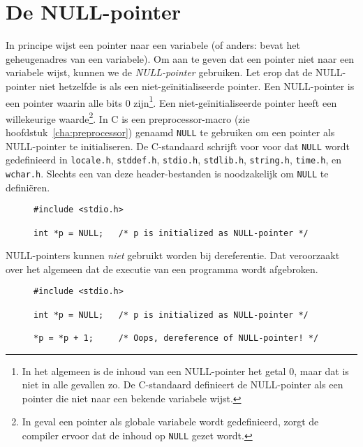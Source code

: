 \section{De NULL-pointer}
\label{sec:nullpointer}
In principe wijst een pointer naar een variabele (of anders: bevat het geheugenadres van een variabele). Om aan te geven dat een pointer niet naar een variabele wijst, kunnen we de \textsl{NULL-pointer} gebruiken. Let erop dat de NULL-pointer niet hetzelfde is als een niet-geïnitialiseerde pointer. Een NULL-pointer is een pointer waarin alle bits 0 zijn\footnote{In het algemeen is de inhoud van een NULL-pointer het getal 0, maar dat is niet in alle gevallen zo. De C-standaard definieert de NULL-pointer als een pointer die niet naar een bekende variabele wijst.}. Een niet-geïnitialiseerde pointer heeft een willekeurige waarde\footnote{In geval een pointer als globale variabele wordt gedefinieerd, zorgt de compiler ervoor dat de inhoud op \texttt{NULL} gezet wordt.}. In C is een preprocessor-macro (zie hoofdstuk~\ref{cha:preprocessor}) genaamd \texttt{NULL} te gebruiken om een pointer als NULL-pointer te initialiseren. De C-standaard schrijft voor voor dat \texttt{NULL} wordt gedefinieerd in \texttt{locale.h}, \texttt{stddef.h}, \texttt{stdio.h}, \texttt{stdlib.h}, \texttt{string.h}, \texttt{time.h}, en \texttt{wchar.h}. Slechts een van deze header-bestanden is noodzakelijk om \texttt{NULL} te definiëren.

\begin{figure}[!ht]
\begin{lstlisting}[caption=Definitie en initialisatie van een NULL-pointer.]
#include <stdio.h>

int *p = NULL;   /* p is initialized as NULL-pointer */
\end{lstlisting}
\end{figure}

NULL-pointers kunnen \textsl{niet} gebruikt worden bij dereferentie. Dat veroorzaakt over het algemeen dat de executie van een programma wordt afgebroken.

\begin{figure}[!ht]
\begin{lstlisting}[caption=Dereferentie van een NULL-pointer.]
#include <stdio.h>

int *p = NULL;   /* p is initialized as NULL-pointer */

*p = *p + 1;     /* Oops, dereference of NULL-pointer! */
\end{lstlisting}
\end{figure}


